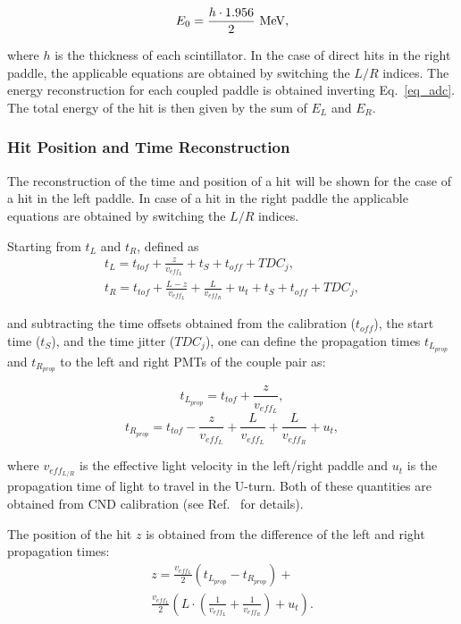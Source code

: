 \begin{equation}
\label{eq_def_e0}
E_0=\frac{h\cdot 1.956}{2}~{\rm MeV},
\end{equation}

\noindent
where $h$ is the thickness of each scintillator. In the case of direct hits in the right paddle, the applicable equations
are obtained by switching the $L/R$ indices. The energy reconstruction for each coupled paddle is obtained inverting
Eq.~\ref{eq_adc}. The total energy of the hit is then given by the sum of $E_L$ and $E_R$.

\subsubsection{Hit Position and Time Reconstruction}

The reconstruction of the time and position of a hit will be shown for the case of a hit in the left paddle. In case
of a hit in the right paddle the applicable equations are obtained by switching the $L/R$ indices.

Starting from $t_L$ and $t_R$, defined as
\begin{multline}
\label{eq_time_hit}
t_L = t_{tof} +\frac{z}{v_{eff_L}} +t_S + t_{off} + TDC_j,\\
t_R = t_{tof} + \frac{L-z}{v_{eff_L}} + \frac{L}{v_{eff_R}} + u_t + t_S + t_{off} + TDC_j,
\end{multline}

\noindent
and subtracting the time offsets obtained from the calibration ($t_{off}$), the start time ($t_S$), and the time
jitter ($TDC_j$), one can define the propagation times $t_{L_{prop}}$ and $t_{R_{prop}}$ to the left and right
PMTs of the couple pair as:

\begin{equation}
t_{L_{prop}} = t_{tof} + \frac{z}{v_{eff_L}},
\end{equation}
\begin{equation}
t_{R_{prop}} = t_{tof} - \frac{z}{v_{eff_L}} + \frac{L}{v_{eff_L}} + \frac{L}{v_{eff_R}} + u_t,
\end{equation}

\noindent
where $v_{eff_{L/R}}$ is the effective light velocity in the left/right paddle and $u_t$ is the propagation time of
light to travel in the U-turn. Both of these quantities are obtained from CND calibration (see Ref.~\cite{cnd-nim}
for details).

The position of the hit $z$ is obtained from the difference of the left and right propagation times:
\begin{multline}
  z = \frac{v_{eff_L}}{2} \left(t_{L_{prop}} - t_{R_{prop}} \right) + \\ \frac{v_{eff_L}}{2} \left( L \cdot \left(\frac{1}{v_{eff_L}}
  + \frac{1}{v_{eff_R}}\right) + u_t \right).
\end{multline}


